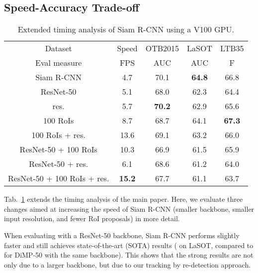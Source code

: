 \documentclass[10pt,twocolumn,letterpaper]{article}
\begin{document}
\subsection{Speed-Accuracy Trade-off}
\begin{table}[t]
\centering{}\footnotesize
\setlength{\tabcolsep}{3pt}
\begin{tabular}{ccccc}
\toprule 
{\footnotesize{}Dataset} & {\footnotesize{}Speed} & {\footnotesize{}OTB2015} & {\footnotesize{}LaSOT} & {\footnotesize{}LTB35}\tabularnewline
{\footnotesize{}Eval measure} & {\footnotesize{}FPS} & {\footnotesize{}AUC} & {\footnotesize{}AUC} & {\footnotesize{}F}\tabularnewline
\midrule
{\footnotesize{}Siam R-CNN} & {\footnotesize{}4.7} & {\footnotesize{}70.1} & {\footnotesize{}\textbf{64.8}} & {\footnotesize{}66.8}\tabularnewline
\midrule
{\footnotesize{}ResNet-50} & {\footnotesize{}5.1} & {\footnotesize{}68.0} & {\footnotesize{}62.3} & {\footnotesize{}64.4}\tabularnewline
{\footnotesize{} res.} & {\footnotesize{}5.7} & {\footnotesize{}\textbf{70.2}} & {\footnotesize{}62.9} & {\footnotesize{}65.6}\tabularnewline
{\footnotesize{}100 RoIs} & {\footnotesize{}8.7} & {\footnotesize{}68.7} & {\footnotesize{}64.1} & {\footnotesize{}\textbf{67.3}}\tabularnewline
{\footnotesize{}100 RoIs +  res.} & {\footnotesize{}13.6} & {\footnotesize{}69.1} & {\footnotesize{}63.2} & {\footnotesize{}66.0}\tabularnewline
{\footnotesize{}ResNet-50 + 100 RoIs} & {\footnotesize{}10.3} & {\footnotesize{}66.9} & {\footnotesize{}61.5} & {\footnotesize{}65.9}\tabularnewline
{\footnotesize{}ResNet-50 +  res.} & {\footnotesize{}6.1} & {\footnotesize{}68.6} & {\footnotesize{}61.2} & {\footnotesize{}64.0}\tabularnewline
{\footnotesize{}ResNet-50 + 100 RoIs +  res.} & {\footnotesize{}\textbf{15.2}} & {\footnotesize{}67.7} & {\footnotesize{}61.1} & {\footnotesize{}63.7}\tabularnewline
\bottomrule
\end{tabular}\caption{\label{tab:ablations-extended}Extended timing analysis of Siam R-CNN using a V100 GPU.}
\end{table}
 Tab.~\ref{tab:ablations-extended} extends the timing analysis of the main paper. Here, we evaluate three changes aimed at increasing the speed of Siam R-CNN (smaller backbone, smaller input resolution, and fewer RoI proposals) in more detail.

When evaluating with a ResNet-50 backbone, Siam R-CNN performs slightly faster and still achieves state-of-the-art (SOTA) results ( on LaSOT, compared to  for DiMP-50 with the same backbone). This shows that the strong results are not only due to a larger backbone, but due to our tracking by re-detection approach.
\end{document}

